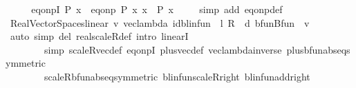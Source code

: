 \begin{isabellebody}
%
\isadelimproof
%
\endisadelimproof
%
\isatagproof
{}\isamarkupfalse%
\ {\isacharminus}{\kern0pt}\isanewline
\ \ \isamarkupfalse%
\ eq{\isacharunderscore}{\kern0pt}onpI{\isacharcolon}{\kern0pt}\ {\isachardoublequoteopen}P\ x\ {\isasymLongrightarrow}\ eq{\isacharunderscore}{\kern0pt}onp\ P\ x\ x{\isachardoublequoteclose}\ \ P\ x\isanewline
\ \ \ \ \isamarkupfalse%
{\isacharparenleft}{\kern0pt}simp\ add{\isacharcolon}{\kern0pt}\ eq{\isacharunderscore}{\kern0pt}onp{\isacharunderscore}{\kern0pt}def{\isacharparenright}{\kern0pt}\isanewline
\isanewline
\ \ \isamarkupfalse%
\ {\isachardoublequoteopen}Real{\isacharunderscore}{\kern0pt}Vector{\isacharunderscore}{\kern0pt}Spaces{\isachardot}{\kern0pt}linear\ {\isacharparenleft}{\kern0pt}{\isasymlambda}v{\isachardot}{\kern0pt}\ vec{\isacharunderscore}{\kern0pt}lambda\ {\isacharparenleft}{\kern0pt}{\isacharparenleft}{\kern0pt}{\isacharparenleft}{\kern0pt}id{\isacharunderscore}{\kern0pt}blinfun\ {\isacharminus}{\kern0pt}\ l\ {\isacharasterisk}{\kern0pt}\isactrlsub R\ {\isasymP}\ d{\isacharparenright}{\kern0pt}\ {\isacharparenleft}{\kern0pt}bfun{\isachardot}{\kern0pt}Bfun\ {\isacharparenleft}{\kern0pt}{\isacharparenleft}{\kern0pt}{\isachardollar}{\kern0pt}{\isacharparenright}{\kern0pt}\ v{\isacharparenright}{\kern0pt}{\isacharparenright}{\kern0pt}{\isacharparenright}{\kern0pt}{\isacharparenright}{\kern0pt}{\isacharparenright}{\kern0pt}{\isachardoublequoteclose}\isanewline
\ \ \ \ \isamarkupfalse%
\ {\isacharparenleft}{\kern0pt}auto\ simp\ del{\isacharcolon}{\kern0pt}\ real{\isacharunderscore}{\kern0pt}scaleR{\isacharunderscore}{\kern0pt}def\ intro{\isacharcolon}{\kern0pt}\ linearI\isanewline
\ \ \ \ \ \ \ \ simp{\isacharcolon}{\kern0pt}\ scaleR{\isacharunderscore}{\kern0pt}vec{\isacharunderscore}{\kern0pt}def\ eq{\isacharunderscore}{\kern0pt}onpI\ plus{\isacharunderscore}{\kern0pt}vec{\isacharunderscore}{\kern0pt}def\ vec{\isacharunderscore}{\kern0pt}lambda{\isacharunderscore}{\kern0pt}inverse\ plus{\isacharunderscore}{\kern0pt}bfun{\isachardot}{\kern0pt}abs{\isacharunderscore}{\kern0pt}eq{\isacharbrackleft}{\kern0pt}symmetric{\isacharbrackright}{\kern0pt}\ \isanewline
\ \ \ \ \ \ \ \ scaleR{\isacharunderscore}{\kern0pt}bfun{\isachardot}{\kern0pt}abs{\isacharunderscore}{\kern0pt}eq{\isacharbrackleft}{\kern0pt}symmetric{\isacharbrackright}{\kern0pt}\ blinfun{\isachardot}{\kern0pt}scaleR{\isacharunderscore}{\kern0pt}right\ blinfun{\isachardot}{\kern0pt}add{\isacharunderscore}{\kern0pt}right{\isacharparenright}{\kern0pt}\isanewline

\end{isabellebody}
